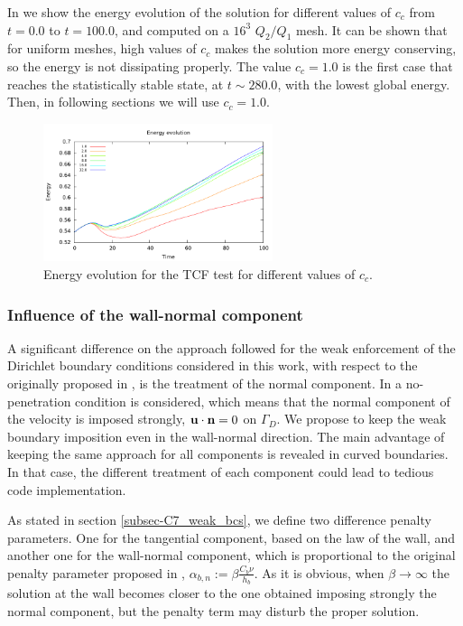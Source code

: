 In  we show the energy evolution of the solution for different values of $ c_c $ from $ t=0.0 $ to $ t=100.0 $, and computed on a $ 16^3 $ $ Q_2/Q_1 $ mesh. It can be shown that for uniform meshes, high values of $ c_c $ makes the solution more energy conserving, so the energy is not dissipating properly. The value $ c_c=1.0 $ is the first case that reaches the statistically stable state, at $ t\sim280.0 $, with the lowest global energy. Then, in following sections we will use $ c_c=1.0 $.
\begin{figure}[h!]
  \centering
  \includegraphics[width=0.6\textwidth]{Figures/Chapter7/TCF/ene_ktc}
  \caption{Energy evolution for the TCF test for different values of $ c_c $.}
  \label{fig-TCF_ene_ktc}
\end{figure}

\subsubsection{Influence of the wall-normal component}
\label{subsubsec-C7_TCF_wall_normal}
A significant difference on the approach followed for the weak enforcement of the Dirichlet boundary conditions considered in this work, with respect to the originally proposed in \cite{bazilevs_weak_2007}, is the treatment of the normal component. In \cite{bazilevs_weak_2007} a no-penetration condition is considered, which means that the normal component of the velocity is imposed strongly, $ {\bf u}\cdot{\bf n}=0 $ on $ \Gamma_D $. We propose to keep the weak boundary imposition even in the wall-normal direction. The main advantage of keeping the same approach for all components is revealed in curved boundaries. In that case, the different treatment of each component could lead to tedious code implementation.

As stated in section \ref{subsec-C7_weak_bcs}, we define two difference penalty parameters. One for the tangential component, based on the law of the wall, and another one for the wall-normal component, which is proportional to the original penalty parameter proposed in \cite{bazilevs_weak_2007-1}, $ \alpha_{b,n}:=\beta\frac{C_b\nu}{h_b} $. As it is obvious, when $ \beta\rightarrow\infty $ the solution at the wall becomes closer to the one obtained imposing strongly the normal component, but the penalty term may disturb the proper solution. 

